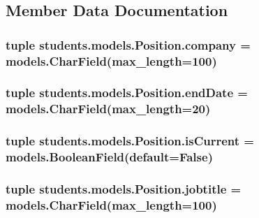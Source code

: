 \subsection{Member Data Documentation}
\hypertarget{classstudents_1_1models_1_1_position_ac37b3ab263fab4dec8977add069b5bf6}{
\subsubsection[{company}]{\setlength{\rightskip}{0pt plus 5cm}tuple students.\-models.\-Position.\-company = models.\-Char\-Field(max\-\_\-length=100)\hspace{0.3cm}{\ttfamily [static]}}}\label{classstudents_1_1models_1_1_position_ac37b3ab263fab4dec8977add069b5bf6}
\hypertarget{classstudents_1_1models_1_1_position_ae2f7035f644cc07659733c538cc17672}{
\subsubsection[{end\-Date}]{\setlength{\rightskip}{0pt plus 5cm}tuple students.\-models.\-Position.\-end\-Date = models.\-Char\-Field(max\-\_\-length=20)\hspace{0.3cm}{\ttfamily [static]}}}\label{classstudents_1_1models_1_1_position_ae2f7035f644cc07659733c538cc17672}
\hypertarget{classstudents_1_1models_1_1_position_a5946dc44ba06da0bc7e92d7e2b3c3cab}{
\subsubsection[{is\-Current}]{\setlength{\rightskip}{0pt plus 5cm}tuple students.\-models.\-Position.\-is\-Current = models.\-Boolean\-Field(default=False)\hspace{0.3cm}{\ttfamily [static]}}}\label{classstudents_1_1models_1_1_position_a5946dc44ba06da0bc7e92d7e2b3c3cab}
\hypertarget{classstudents_1_1models_1_1_position_a20d8abf316914fea1d9f69d26c531759}{
\subsubsection[{jobtitle}]{\setlength{\rightskip}{0pt plus 5cm}tuple students.\-models.\-Position.\-jobtitle = models.\-Char\-Field(max\-\_\-length=100)\hspace{0.3cm}{\ttfamily [static]}}}\label{classstudents_1_1models_1_1_position_a20d8abf316914fea1d9f69d26c531759}
